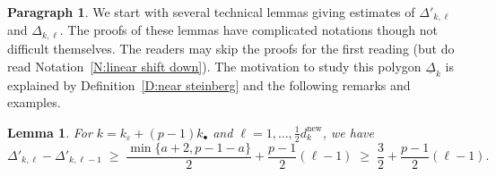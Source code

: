 \documentclass[12pt]{amsart}
\newtheorem{lemma}[subsection]{Lemma}
\theoremstyle{definition}
\newtheorem{para}[subsection]{Paragraph}
\numberwithin{equation}{subsection}
\newcommand{\new}{\mathrm{new}}
\begin{document}
\begin{para}
\label{P:para_154}
We start with several technical lemmas giving estimates of $\Delta'_{k, \ell}$ and $\Delta_{k,\ell}$.  The proofs of these lemmas have complicated notations though not difficult themselves. The readers may skip the proofs for the first reading (but do read Notation~\ref{N:linear shift down}). The motivation to study this polygon $\underline \Delta_k$ is explained by Definition~\ref{D:near steinberg} and the following remarks and examples.
\end{para}
\begin{lemma}
\label{L:estimate Delta kell}
For $k =k_\varepsilon + (p-1)k_{\bullet}$ and $\ell = 1,\dots, \frac 12 d_{k}^\new$, we have
$$
\Delta'_{k, \ell} - \Delta'_{k, \ell-1}\;\geq\; \frac {\min\{a+2, p-1-a\}}2+ \frac {p-1}2 (\ell-1) \;\geq\;  \frac 32 + \frac {p-1}2(\ell-1).%
$$
\end{lemma}
\end{document}
